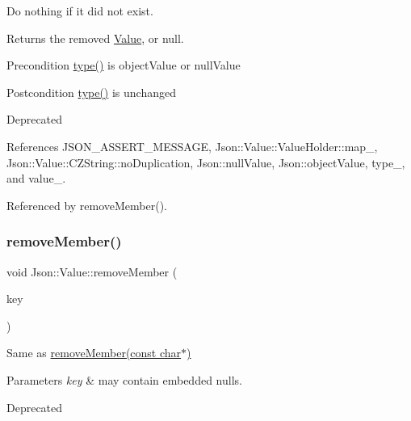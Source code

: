 Do nothing if it did not exist. \begin{DoxyReturn}{Returns}
the removed \hyperlink{classJson_1_1Value}{Value}, or null. 
\end{DoxyReturn}
\begin{DoxyPrecond}{Precondition}
\hyperlink{classJson_1_1Value_a8ce61157a011894f0252ceed232312de_a8ce61157a011894f0252ceed232312de}{type()} is object\+Value or null\+Value 
\end{DoxyPrecond}
\begin{DoxyPostcond}{Postcondition}
\hyperlink{classJson_1_1Value_a8ce61157a011894f0252ceed232312de_a8ce61157a011894f0252ceed232312de}{type()} is unchanged 
\end{DoxyPostcond}
\begin{DoxyRefDesc}{Deprecated}
\item[\hyperlink{deprecated__deprecated000001}{Deprecated}]\end{DoxyRefDesc}


References J\+S\+O\+N\+\_\+\+A\+S\+S\+E\+R\+T\+\_\+\+M\+E\+S\+S\+A\+GE, Json\+::\+Value\+::\+Value\+Holder\+::map\+\_\+, Json\+::\+Value\+::\+C\+Z\+String\+::no\+Duplication, Json\+::null\+Value, Json\+::object\+Value, type\+\_\+, and value\+\_\+.



Referenced by remove\+Member().

\mbox{\label{classJson_1_1Value_a8a660202bbad35857b39e85bd35ec78a_a8a660202bbad35857b39e85bd35ec78a}} 
\subsubsection{\texorpdfstring{remove\+Member()}{removeMember()}\hspace{0.1cm}{\footnotesize\ttfamily [2/5]}}
{\footnotesize\ttfamily void Json\+::\+Value\+::remove\+Member (\begin{DoxyParamCaption}\item[{const \hyperlink{json_8h_a1e723f95759de062585bc4a8fd3fa4be_a1e723f95759de062585bc4a8fd3fa4be}{J\+S\+O\+N\+C\+P\+P\+\_\+\+S\+T\+R\+I\+NG} \&}]{key }\end{DoxyParamCaption})}

Same as \hyperlink{classJson_1_1Value_a92e165f04105d27a930fb3a18a053585_a92e165f04105d27a930fb3a18a053585}{remove\+Member(const char$\ast$)} 
\begin{DoxyParams}{Parameters}
{\em key} & may contain embedded nulls. \\
\hline
\end{DoxyParams}
\begin{DoxyRefDesc}{Deprecated}
\item[\hyperlink{deprecated__deprecated000002}{Deprecated}]\end{DoxyRefDesc}


